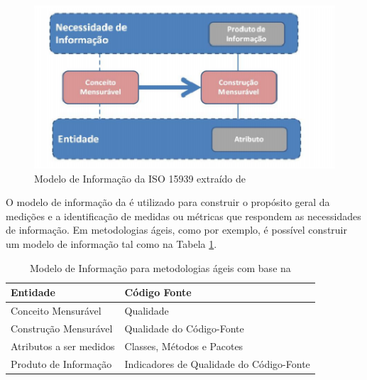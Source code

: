 \begin{figure}[h!]
\centering
	\includegraphics[keepaspectratio=true,scale=1]{figuras/mensuravel.eps}
	\caption{Modelo de Informação da ISO 15939 extraído de 
	}
	\label{informação}
\end{figure}
\FloatBarrier

O modelo de informação da  é utilizado para construir o 
propósito geral da medições e a identificação de medidas ou métricas que 
respondem as necessidades de informação. Em metodologias ágeis, 
como por exemplo, é possível construir um modelo de informação tal como na 
Tabela \ref{construção-ágil}.

	\begin{table}[!ht]
	\begin{center}
	 \begin{tabular}{|l|l|}
		\hline
		Entidade  & Código Fonte 
		\\ \hline
		Conceito Mensurável       & Qualidade      
		\\ \hline
		Construção Mensurável       & Qualidade do Código-Fonte      
		\\ \hline
		Atributos a ser medidos & Classes, Métodos e Pacotes   
		\\ \hline
		Produto de Informação   & Indicadores de Qualidade do Código-Fonte      
		\\ \hline
		\end{tabular}
		\caption{Modelo de Informação para metodologias ágeis com base na 
		}
		\label{construção-ágil}
		\end{center}
		\end{table}		



